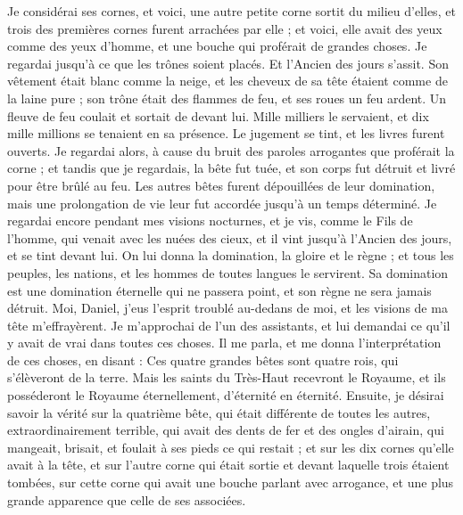 \begin{multicols}{2}
Je considérai ses cornes, et voici, une autre petite corne sortit du milieu d’elles, et trois des premières cornes furent arrachées par elle ; et voici, elle avait des yeux comme des yeux d’homme, et une bouche qui proférait de grandes choses.
Je regardai jusqu'à ce que les trônes soient placés. Et l'Ancien des jours s'assit. Son vêtement était blanc comme la neige, et les cheveux de sa tête étaient comme de la laine pure ; son trône était des flammes de feu, et ses roues un feu ardent.
Un fleuve de feu coulait et sortait de devant lui. Mille milliers le servaient, et dix mille millions se tenaient en sa présence.  Le jugement se tint, et les livres furent ouverts.
Je regardai alors, à cause du bruit des paroles arrogantes que proférait la corne ; et tandis que je regardais, la bête fut tuée, et son corps fut détruit et livré pour être brûlé au feu.
Les autres bêtes furent dépouillées de leur domination, mais une prolongation de vie leur fut accordée jusqu'à un temps déterminé.
Je regardai encore pendant mes visions nocturnes, et je vis, comme le Fils de l'homme, qui venait avec les nuées des cieux, et il vint jusqu'à l'Ancien des jours, et se tint devant lui.
On lui donna la domination, la gloire et le règne ; et tous les peuples, les nations, et les hommes de toutes langues le servirent. Sa domination est une domination éternelle qui ne passera point, et son règne ne sera jamais détruit.
Moi, Daniel, j’eus l'esprit troublé au-dedans de moi, et les visions de ma tête m’effrayèrent.
Je m'approchai de l'un des assistants, et lui demandai ce qu’il y avait de vrai dans toutes ces choses.  Il me parla, et me donna l'interprétation de ces choses, en disant :
Ces quatre grandes bêtes sont quatre rois, qui s'élèveront de la terre.
Mais les saints du Très-Haut recevront le Royaume, et ils posséderont le Royaume éternellement, d’éternité en éternité.
Ensuite, je désirai savoir la vérité sur la quatrième bête, qui était différente de toutes les autres, extraordinairement terrible, qui avait des dents de fer et des ongles d'airain, qui mangeait, brisait, et foulait à ses pieds ce qui restait ;
et sur les dix cornes qu’elle avait à la tête, et sur l'autre corne qui était sortie et devant laquelle trois étaient tombées, sur cette corne qui avait une bouche parlant avec arrogance, et une plus grande apparence que celle de ses associées.

\end{multicols}
